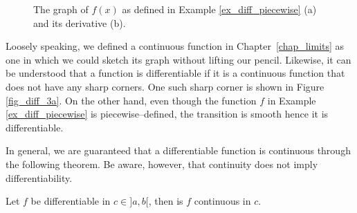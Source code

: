 \begin{figure}[h]
\centering
{}
\qquad
{}
\caption{The graph of $f(x)$ as defined in Example \ref{ex_diff_piecewise} (a) and its derivative (b). }
\end{figure}

Loosely speaking, we defined a continuous function in Chapter~\ref{chap_limits} as one in which we could sketch its graph without lifting our pencil. Likewise, it can be understood that a function is differentiable if it is a continuous function that does not have any sharp corners. One such sharp corner is shown in Figure \ref{fig_diff_3a}. On the other hand, even though the function $f$ in Example \ref{ex_diff_piecewise} is piecewise--defined, the transition is smooth hence it is differentiable.


\ifanalysis

In general, we are guaranteed that a differentiable function is continuous through the following theorem. Be aware, however, that continuity does not imply differentiability. 

\begin{theorem}
Let $f$ be differentiable in $c\in]a,b[$, then is $f$ continuous in $c$.
\end{theorem}

